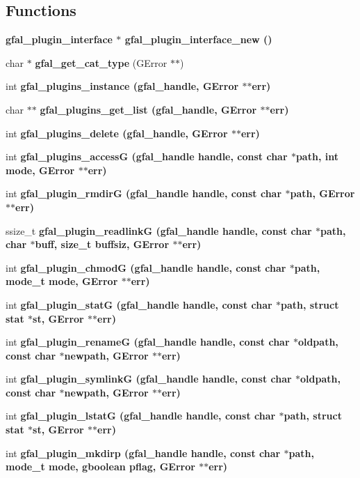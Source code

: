 \subsection*{Functions}
\begin{CompactItemize}
\item 
\bf{gfal\_\-plugin\_\-interface} $\ast$ \bf{gfal\_\-plugin\_\-interface\_\-new} ()
\item 
char $\ast$ \textbf{gfal\_\-get\_\-cat\_\-type} (GError $\ast$$\ast$)\label{gfal__common__plugin_8h_791ad55a9c8aaca0bb8ae74a3538c202}

\item 
int \bf{gfal\_\-plugins\_\-instance} (gfal\_\-handle, GError $\ast$$\ast$err)
\item 
char $\ast$$\ast$ \bf{gfal\_\-plugins\_\-get\_\-list} (gfal\_\-handle, GError $\ast$$\ast$err)
\item 
int \bf{gfal\_\-plugins\_\-delete} (gfal\_\-handle, GError $\ast$$\ast$err)
\item 
int \bf{gfal\_\-plugins\_\-access\-G} (gfal\_\-handle handle, const char $\ast$path, int mode, GError $\ast$$\ast$err)
\item 
int \bf{gfal\_\-plugin\_\-rmdir\-G} (gfal\_\-handle handle, const char $\ast$path, GError $\ast$$\ast$err)
\item 
ssize\_\-t \bf{gfal\_\-plugin\_\-readlink\-G} (gfal\_\-handle handle, const char $\ast$path, char $\ast$buff, size\_\-t buffsiz, GError $\ast$$\ast$err)
\item 
int \bf{gfal\_\-plugin\_\-chmod\-G} (gfal\_\-handle handle, const char $\ast$path, mode\_\-t mode, GError $\ast$$\ast$err)
\item 
int \bf{gfal\_\-plugin\_\-stat\-G} (gfal\_\-handle handle, const char $\ast$path, struct stat $\ast$st, GError $\ast$$\ast$err)
\item 
int \bf{gfal\_\-plugin\_\-rename\-G} (gfal\_\-handle handle, const char $\ast$oldpath, const char $\ast$newpath, GError $\ast$$\ast$err)
\item 
int \bf{gfal\_\-plugin\_\-symlink\-G} (gfal\_\-handle handle, const char $\ast$oldpath, const char $\ast$newpath, GError $\ast$$\ast$err)
\item 
int \bf{gfal\_\-plugin\_\-lstat\-G} (gfal\_\-handle handle, const char $\ast$path, struct stat $\ast$st, GError $\ast$$\ast$err)
\item 
int \bf{gfal\_\-plugin\_\-mkdirp} (gfal\_\-handle handle, const char $\ast$path, mode\_\-t mode, gboolean pflag, GError $\ast$$\ast$err)
\item 
$$
\end{CompactItemize}
